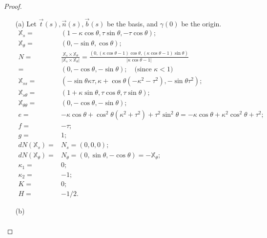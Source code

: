 \documentclass[10pt,a4paper]{article}
\begin{document}
\begin{proof}
\begin{enumerate}
\item[(a)] 
Let $\vec{t}(s), \vec{n}(s), \vec{b}(s)$ be the basis, and $\gamma(0)$ be the origin.
\begin{align*}
\mathbb{X}_{s} =& (1 - \kappa\cos\theta, \tau\sin\theta, -\tau\cos\theta); \\
\mathbb{X}_{\theta} =& (0, -\sin\theta, \cos\theta); \\
N =& \frac{\mathbb{X}_{s} \times \mathbb{X}_{\theta}}{|\mathbb{X}_{s} \times \mathbb{X}_{\theta}|} = \frac{(0, (\kappa\cos\theta - 1)\cos\theta, (\kappa\cos\theta - 1)\sin\theta)}{|\kappa\cos\theta - 1|} \\
  =& (0, -\cos\theta, -\sin\theta); \quad\text{(since $\kappa< 1$)} \\
\mathbb{X}_{ss} =& (-\sin\theta\kappa\tau, \kappa + \cos\theta(-\kappa^2 - \tau^2), -\sin\theta\tau^2); \\
\mathbb{X}_{s\theta} =& (1 + \kappa\sin\theta, \tau\cos\theta, \tau\sin\theta); \\
\mathbb{X}_{\theta\theta} =& (0, -\cos\theta, -\sin\theta); \\
e =& -\kappa\cos\theta + \cos^2\theta(\kappa^2 + \tau^2) + \tau^2\sin^2\theta = -\kappa\cos\theta + \kappa^2\cos^2\theta + \tau^2; \\
f =& -\tau; \\
g =& 1; \\
dN(\mathbb{X}_{s}) =& N_{s} = (0, 0, 0); \\
dN(\mathbb{X}_{\theta}) =& N_{\theta} = (0, \sin\theta, -\cos\theta) = -\mathbb{X}_{\theta}; \\
\kappa_1 =& 0; \\
\kappa_2 =& -1; \\
K =& 0; \\
H =& -1/2.
\end{align*}
\item[(b)] 
\begin{align*}
\end{align*}
\end{enumerate}
\end{proof}
\end{document}
